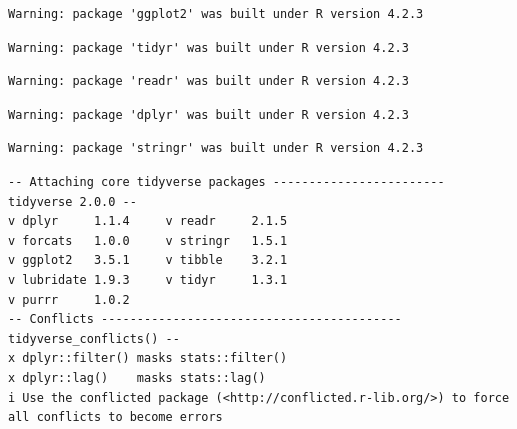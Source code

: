 \documentclass[
  letterpaper,
  DIV=11,
  numbers=noendperiod]{scrreprt}
\newenvironment{Shaded}{\begin{snugshade}}{\end{snugshade}}
\newcommand{\AttributeTok}[1]{\textcolor[rgb]{0.40,0.45,0.13}{#1}}
\newcommand{\DecValTok}[1]{\textcolor[rgb]{0.68,0.00,0.00}{#1}}
\newcommand{\DocumentationTok}[1]{\textcolor[rgb]{0.37,0.37,0.37}{\textit{#1}}}
\newcommand{\FunctionTok}[1]{\textcolor[rgb]{0.28,0.35,0.67}{#1}}
\newcommand{\NormalTok}[1]{\textcolor[rgb]{0.00,0.23,0.31}{#1}}
\newcommand{\OtherTok}[1]{\textcolor[rgb]{0.00,0.23,0.31}{#1}}
\newcommand{\SpecialCharTok}[1]{\textcolor[rgb]{0.37,0.37,0.37}{#1}}
\begin{document}
\begin{verbatim}
Warning: package 'ggplot2' was built under R version 4.2.3
\end{verbatim}

\begin{verbatim}
Warning: package 'tidyr' was built under R version 4.2.3
\end{verbatim}

\begin{verbatim}
Warning: package 'readr' was built under R version 4.2.3
\end{verbatim}

\begin{verbatim}
Warning: package 'dplyr' was built under R version 4.2.3
\end{verbatim}

\begin{verbatim}
Warning: package 'stringr' was built under R version 4.2.3
\end{verbatim}

\begin{verbatim}
-- Attaching core tidyverse packages ------------------------ tidyverse 2.0.0 --
v dplyr     1.1.4     v readr     2.1.5
v forcats   1.0.0     v stringr   1.5.1
v ggplot2   3.5.1     v tibble    3.2.1
v lubridate 1.9.3     v tidyr     1.3.1
v purrr     1.0.2     
-- Conflicts ------------------------------------------ tidyverse_conflicts() --
x dplyr::filter() masks stats::filter()
x dplyr::lag()    masks stats::lag()
i Use the conflicted package (<http://conflicted.r-lib.org/>) to force all conflicts to become errors
\end{verbatim}

\begin{Shaded}
\end{Shaded}
\end{document}
